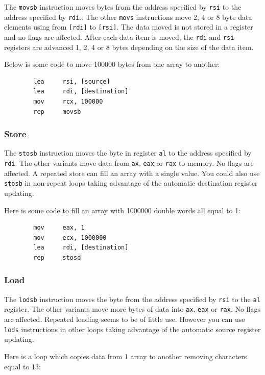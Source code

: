 \documentclass[11pt,b5paper]{book}
\begin{document}
The {\tt movsb} instruction moves  bytes from the address specified by {\tt rsi} to the address specified by 
{\tt rdi}..
The other {\tt movs} instructions move 2, 4 or 8 byte data elements using from {\tt [rdi]} to {\tt [rsi]}.
The data moved is not stored in a register and no flags are affected.
After each data item is moved, the {\tt rdi} and {\tt rsi} registers are advanced 1, 2, 4 or 8 bytes
depending on the size of the data item.

Below is some code to move 100000 bytes from one array to another:

\begin{verbatim}
        lea     rsi, [source]
        lea     rdi, [destination]
        mov     rcx, 100000
        rep     movsb
\end{verbatim}


\subsubsection{Store}

The {\tt stosb} instruction moves the byte in register {\tt al} to the address specified by 
{\tt rdi}.
The other variants move data from {\tt ax}, {\tt eax} or {\tt rax} to memory.
No flags are affected.
A repeated store can fill an array with a single value.
You could also use {\tt stosb} in non-repeat loops taking advantage of the automatic destination
register updating.

Here is some code to fill an array with 1000000 double words all equal to 1:

\begin{verbatim}
        mov     eax, 1
        mov     ecx, 1000000
        lea     rdi, [destination]
        rep     stosd
\end{verbatim}

\subsubsection{Load}

The {\tt lodsb} instruction moves the byte from the address specified by {\tt rsi} to the {\tt al} 
register.
The other variants move more bytes of data into {\tt ax}, {\tt eax} or {\tt rax}.
No flags are affected.
Repeated loading seems to be of little use.
However you can use {\tt lods} instructions in other loops taking advantage of the automatic
source register updating.

Here is a loop which copies data from 1 array to another removing characters equal to 13:
\end{document}
